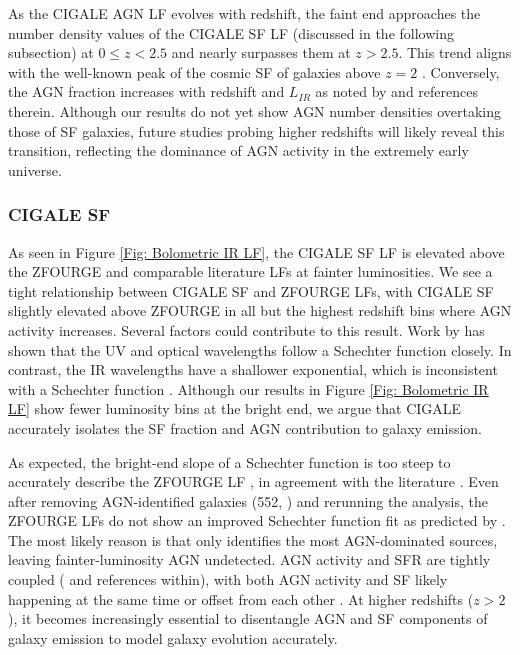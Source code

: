 As the CIGALE AGN LF evolves with redshift, the faint end approaches the number density values of the CIGALE SF LF (discussed in the following subsection) at $0 \leq z < 2.5$ and nearly surpasses them at $z > 2.5$. This trend aligns with the well-known peak of the cosmic SF of galaxies above $z=2$ \citep{madau_cosmic_2014}. Conversely, the AGN fraction increases with redshift and $L_{IR}$ as noted by \cite{symeonidis_agn_2021, thorne_deep_2022} and references therein. Although our results do not yet show AGN number densities overtaking those of SF galaxies, future studies probing higher redshifts will likely reveal this transition, reflecting the dominance of AGN activity in the extremely early universe.

\subsubsection{CIGALE SF}
As seen in Figure \ref{Fig: Bolometric IR LF}, the CIGALE SF LF is elevated above the ZFOURGE and comparable literature LFs at fainter luminosities. We see a tight relationship between CIGALE SF and ZFOURGE LFs, with CIGALE SF slightly elevated above ZFOURGE in all but the highest redshift bins where AGN activity increases. Several factors could contribute to this result. Work by \cite{wu_mid-infrared_2011} has shown that the UV and optical wavelengths follow a Schechter function closely. In contrast, the IR wavelengths have a shallower exponential, which is inconsistent with a Schechter function \citep{symeonidis_what_2019}. Although our results in Figure \ref{Fig: Bolometric IR LF} show fewer luminosity bins at the bright end, we argue that CIGALE accurately isolates the SF fraction and AGN contribution to galaxy emission. 


As expected, the bright-end slope of a Schechter function is too steep to accurately describe the ZFOURGE LF \citep{wu_mid-infrared_2011}, in agreement with the literature \citep{rodighiero_mid-_2010, gruppioni_herschel_2013, symeonidis_what_2019}. Even after removing AGN-identified galaxies (552, \citealp{cowley_zfourge_2016}) and rerunning the analysis, the ZFOURGE LFs do not show an improved Schechter function fit as predicted by \cite{fu_decomposing_2010, wu_mid-infrared_2011}. The most likely reason is that \cite{cowley_zfourge_2016} only identifies the most AGN-dominated sources, leaving fainter-luminosity AGN undetected. AGN activity and SFR are tightly coupled (\citealp{alexander_what_2012} and references within), with both AGN activity and SF likely happening at the same time or offset from each other \citep{cowley_decoupled_2018}. At higher redshifts ($z > 2$), it becomes increasingly essential to disentangle AGN and SF components of galaxy emission to model galaxy evolution accurately.

